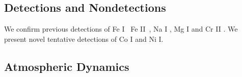 \documentclass[twocolumn]{aastex631}
\begin{document}
                        
                    
        

        \subsection{Detections and Nondetections}\label{subsec:Detections}
        We confirm previous detections of Fe I~\citep{Nugroho2020, Rainer2021} Fe II~\citep{CasasayasBarris2020, Hoeijmakers2020, BelloArufe2022}, Na I \citep{CasasayasBarris2020, Hoeijmakers2020, Nugroho2020, Sicilia2022}, Mg I \citep{Hoeijmakers2020} and Cr II \citep{Hoeijmakers2020}. We present novel tentative detections of Co I and Ni I.

        

        
                


        

        \subsection{Atmospheric Dynamics}\label{subsec:Atmospheric Dynamics}
            
\end{document}
